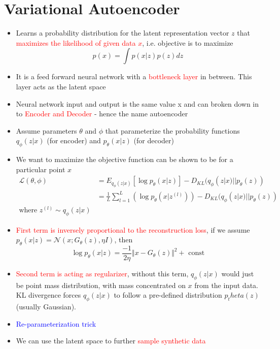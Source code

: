 \documentclass[11pt]{article}
\newcommand{\red}[1]{\textcolor{red}{#1}}
\newcommand{\blue}[1]{\textcolor{blue}{#1}}
\begin{document}
    \section{Variational Autoencoder}
    \begin{itemize}
        \item Learns a probability distribution for the latent representation vector $z$ that \red{maximizes the likelihood of given data $x$}, i.e. objective is to maximize
        $$p(x) = \int p(x|z)p(z)dz$$
        \item It is a feed forward neural network with a \red{bottleneck layer} in between. This layer acts as the latent space
        \item Neural network input and output is the same value x and can broken down in to \red{Encoder and Decoder} - hence the name autoencoder
        \item Assume parameters $\theta$ and $\phi$ that parameterize the probability functions $q_\phi(z|x)$ (for encoder) and $p_{\theta}(x|z)$ (for decoder)
        \item We want to maximize the objective function can be shown to be for a particular point $x$
        \begin{align*}
            \mathcal{L}(\theta, \phi) &= E_{q_\phi(z|x)}{[\log{p_\theta(x|z)}]}  - D_{KL}(q_\phi(z|x)||p_\theta(z)) \\
            &= \frac{1}{L}\sum_{l=1}^L \left( \log {p_\theta(x|z^{(l)})} \right) - D_{KL}(q_\phi(z|x)||p_\theta(z))\\
            \text{where } z^{(l)} \sim q_\phi(z|x)
        \end{align*}
        \item \red{First term is inversely proportional to the reconstruction loss}, if we assume $p_\theta(x|z) = \mathcal{N}(x;G_\theta(z), \eta I)$, then
        $$\log{p_\theta(x|z)}=\frac{-1}{2\eta} \Vert x - G_\theta(z) \Vert^2 + \text{ const}$$
        \item \red{Second term is acting as regularizer}, without this term, $q_\phi(z|x)$ would just be point mass distribution, with mass concentrated on $x$ from the input data. KL divergence forces $q_\phi(z|x)$ to follow a pre-defined distribution $p_theta(z)$ (usually Gaussian).
        \item \blue{Re-parameterization trick}
        \item We can use the latent space to further \red{sample synthetic data}

    \end{itemize}
\end{document}
